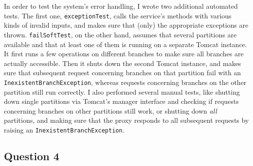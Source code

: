 \documentclass[12pt,a4paper,fleqn]{article}
\begin{document}
In order to test the system's error handling, I wrote two additional automated tests. The first one, \texttt{exceptionTest}, calls the service's methods with various kinds of invalid inputs, and makes sure that (only) the appropriate exceptions are thrown. \texttt{failSoftTest}, on the other hand, assumes that several partitions are available and that at least one of them is running on a separate Tomcat instance. It first runs a few operations on different branches to make sure all branches are actually accessible. Then it shuts down the second Tomcat instance, and makes sure that subsequent request concerning branches on that partition fail with an \texttt{InexistentBranchException}, whereas requests concerning branches on the other partition still run correctly. I also performed several manual tests, like shutting down single partitions via Tomcat's manager interface and checking if requests concerning branches on other partitions still work, or shutting down \emph{all} partitions, and making sure that the proxy responds to all subsequent requests by raising an \texttt{InexistentBranchException}.

\subsection*{Question 4}
\label{sec:pq4}
\end{document}

